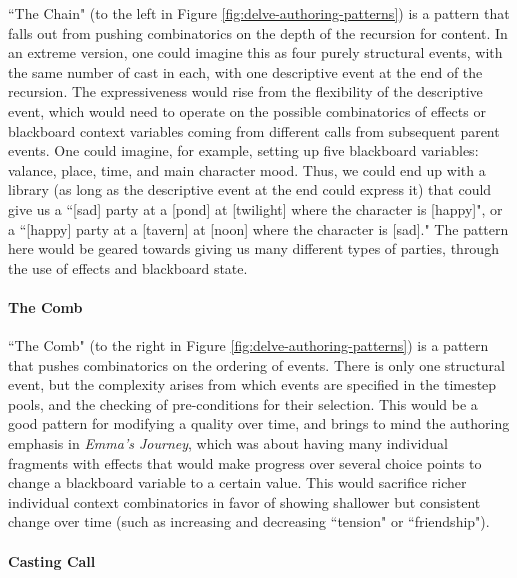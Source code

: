 ``The Chain" (to the left in Figure \ref{fig:delve-authoring-patterns}) is a pattern that falls out from pushing combinatorics on the depth of the recursion for content. In an extreme version, one could imagine this as four purely structural events, with the same number of cast in each, with one descriptive event at the end of the recursion. The expressiveness would rise from the flexibility of the descriptive event, which would need to operate on the possible combinatorics of effects or blackboard context variables coming from different calls from subsequent parent events. One could imagine, for example, setting up five blackboard variables: valance, place, time, and main character mood. Thus, we could end up with a library (as long as the descriptive event at the end could express it) that could give us a ``[sad] party at a [pond] at [twilight] where the character is [happy]", or a ``[happy] party at a [tavern] at [noon] where the character is [sad]." The pattern here would be geared towards giving us many different types of parties, through the use of effects and blackboard state.

\paragraph{The Comb}\label{par:delve-the-comb}

``The Comb" (to the right in Figure \ref{fig:delve-authoring-patterns}) is a pattern that pushes combinatorics on the ordering of events. There is only one structural event, but the complexity arises from which events are specified in the timestep pools, and the checking of pre-conditions for their selection. This would be a good pattern for modifying a quality over time, and brings to mind the authoring emphasis in \textit{Emma's Journey}, which was about having many individual fragments with effects that would make progress over several choice points to change a blackboard variable to a certain value. This would sacrifice richer individual context combinatorics in favor of showing shallower but consistent change over time (such as increasing and decreasing ``tension" or ``friendship").

\paragraph{Casting Call}\label{par:delve-casting-call}


